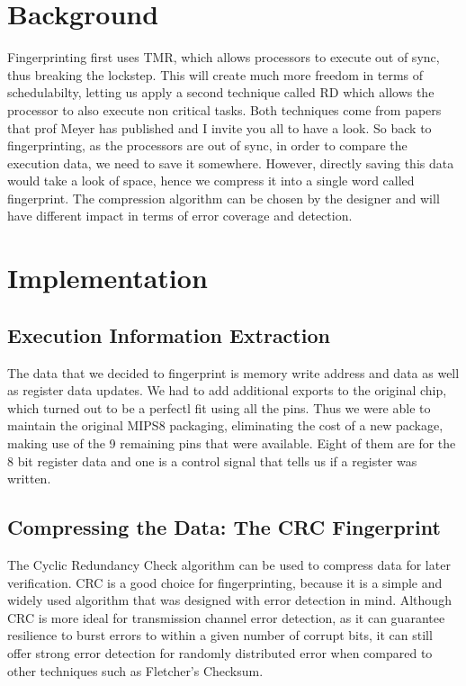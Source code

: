 \documentclass[12pt,journal,compsoc]{IEEEtran}
\begin{document}
\section{Background}
Fingerprinting first uses TMR, which allows processors to execute out of sync, thus breaking the lockstep. This will create much more freedom in terms of schedulabilty, letting us apply a second technique called RD which allows the processor to also execute non critical tasks. Both techniques come from papers that prof Meyer has published and I invite you all to have a look. 
So back to fingerprinting, as the processors are out of sync, in order to compare the execution data, we need to save it somewhere. However, directly saving this data would take a look of space, hence we compress it into a single word called fingerprint. The compression algorithm can be chosen by the designer and will have different impact in terms of error coverage and detection. 

\section{Implementation }
\subsection{Execution Information Extraction}
The data that we decided to fingerprint is memory write address and  data as well as register data updates. We had to add additional exports to the original chip, which turned out to be a perfectl fit using all the pins. Thus we were able to maintain the original MIPS8 packaging, eliminating the cost of a new package, making use of the 9 remaining pins that were available. Eight of them are for the 8 bit register data and one is a control signal that tells us if a register was written. 


\subsection{Compressing the Data: The CRC Fingerprint}

The Cyclic Redundancy Check algorithm can be used to compress data for later verification. CRC is a good choice for fingerprinting, because it is a simple and widely used algorithm that was designed with error detection in mind. Although CRC is more ideal for transmission channel error detection, as it can guarantee resilience to burst errors to within a given number of corrupt bits, it can still offer strong error detection for randomly distributed error when compared to other techniques such as Fletcher's Checksum.\
\end{document}
